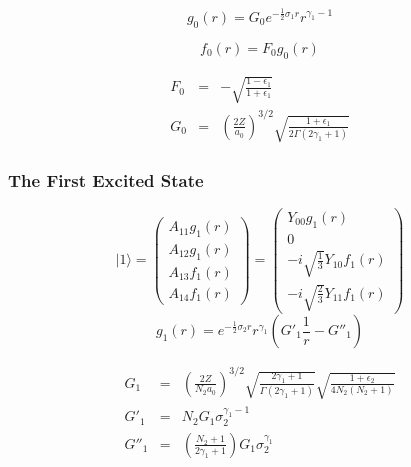 \documentclass[a4paper,titlepage]{report}
\newcommand{\ket}[1]{|#1 \rangle}
\begin{document}
\begin{equation} \label{eq:dirac-g0}
	\boxed{ 
		g_0(r) = G_0 e^{-\frac{1}{2} \sigma_1 r} r^{\gamma_1 - 1} 
	}
\end{equation}

\begin{equation} \label{eq:dirac-f0}
	\boxed{ 	
		f_0(r) = F_0 g_0(r) 
	}
\end{equation}

\begin{eqnarray*}
	F_0 & = & - \sqrt{ \frac{1 - \epsilon_1}{1 + \epsilon_1} }	\\
	G_0 & = & \left( \frac{2Z}{a_0} \right)^{3/2} 
		  	   	\sqrt{\frac{1 + \epsilon_1}{2 \Gamma(2\gamma_1 + 1) }}
\end{eqnarray*}

		\subsubsection{The First Excited State}
\begin{equation}
	\ket{1} = 
		\left(
			\begin{array}{c}
				A_{11} g_1(r) \\
				A_{12} g_1(r) \\
				A_{13} f_1(r) \\
				A_{14} f_1(r)
			\end{array}
		\right)
		=
		\left(
			\begin{array}{c}
				Y_{00} 	g_1(r)	\\
				0	 			\\
				-i \sqrt{\frac{1}{3}} Y_{10} f_1(r) \\
				-i \sqrt{\frac{2}{3}} Y_{11} f_1(r)
			\end{array}
		\right)
\end{equation}
\begin{equation}
	\boxed{ g_1(r) = e^{-\frac{1}{2} \sigma_2 r} r^{\gamma_1} 
		  		  \left( G'_{1}  \frac{1}{r} - G''_{1} \right) }
\end{equation}

\begin{eqnarray*}
	G_1 	& = & \left( \frac{2Z}{N_2 a_0} \right)^{3/2}
		  	  		\sqrt{\frac{2\gamma_1 + 1}{\Gamma(2\gamma_1 + 1)}} 
		  	  		\sqrt{\frac{1 + \epsilon_2}{4N_2 (N_2 + 1)}} \\
	G'_1 	& = & N_2 G_1 \sigma_2^{\gamma_1 - 1} \\
	G''_1 	& = & \left( \frac{N_2 + 1}{2\gamma_1 + 1} \right) G_1 \sigma_2^{\gamma_1}
\end{eqnarray*}
\end{document}
